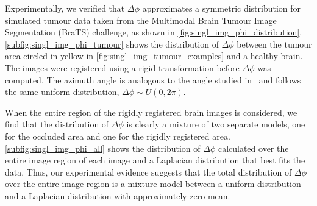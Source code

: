 Experimentally, we verified that $\Delta \phi$ approximates a symmetric
distribution for simulated tumour data taken from the Multimodal Brain Tumour
Image Segmentation (BraTS) challenge, as shown in
\cref{fig:singl_img_phi_distribution}. \cref{subfig:singl_img_phi_tumour} shows the
distribution of $\Delta \phi$ between the tumour area circled in yellow in
\cref{fig:singl_img_tumour_examples} and a healthy brain. The images were registered
using a rigid transformation before $\Delta \phi$ was computed.  The azimuth
angle is analogous to the angle studied in~\cite{tzimiropoulos2011robust}
and follows the same uniform distribution, $\Delta \phi \sim U(0, 2\pi)$.

When the entire region of the rigidly registered brain images is considered, we
find that the distribution of $\Delta \phi$ is clearly a mixture of two separate
models, one for the occluded area and one for the rigidly registered area.
\cref{subfig:singl_img_phi_all} shows the distribution of $\Delta \phi$ calculated
over the entire image region of each image and a Laplacian distribution that
best fits the data. Thus, our experimental evidence suggests that the total
distribution of $\Delta \phi$ over the entire image region is a mixture model
between a uniform distribution and a Laplacian distribution with approximately
zero mean.
